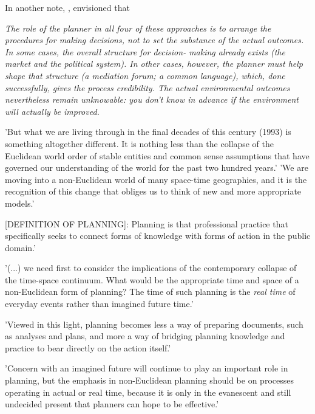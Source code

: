 In another note, \parencite{Campbell1996}, envisioned that 

\textit{The role of the planner in all four of these approaches is to arrange the procedures for making decisions, not to set the substance of the actual outcomes. In some cases, the overall structure for decision- making already exists (the market and the political system). In other cases, however, the planner must help shape that structure (a mediation forum; a common language), which, done successfully, gives the process credibility. The actual environmental outcomes nevertheless remain unknowable: you don’t know in advance if the environment will actually be improved.
}


\parencite{Friedmann1993}
'But what we are living through in the final decades of this century (1993) is something altogether different. It is nothing less than the collapse of the Euclidean world order of stable entities and common sense assumptions that have governed our understanding of the world for the past two hundred years.'
'We are moving into a non-Euclidean world of many space-time geographies, and it is the recognition of this change that obliges us to think of new and more appropriate models.'\par

[DEFINITION OF PLANNING]:
Planning is that professional practice that specifically seeks to connect forms of knowledge with forms of action in the public domain.'\par

'(...) we need first to consider the implications of the contemporary collapse of the time-space continuum. What would be the appropriate time and space of a non-Euclidean form of planning? The time of such planning is the \textit{real time} of everyday events rather than imagined future time.'\par

'Viewed in this light, planning becomes less a way of preparing documents, such as analyses and plans, and more a way of bridging planning knowledge and practice to bear directly on the action itself.'\par

'Concern with an imagined future will continue to play an important role in planning, but the emphasis in non-Euclidean planning should be on processes operating in actual or real time, because it is only in the evanescent and still undecided present that planners can hope to be effective.'\par

